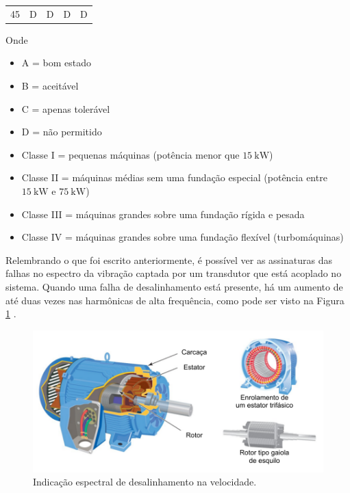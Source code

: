 \begin{table}[H]
\begin{minipage}{.9\textwidth}
\begin{tabular*}{\textwidth}{|c|c|c|c|c|}
            \multicolumn{1}{|c|}{45}              & \multicolumn{1}{c|}{\multirow{-5}{*}{\cellcolor[HTML]{FE0000}D}} & \multicolumn{1}{c|}{\multirow{-4}{*}{\cellcolor[HTML]{FE0000}D}} & \multicolumn{1}{c|}{\multirow{-3}{*}{\cellcolor[HTML]{FE0000}D}} & \multicolumn{1}{c|}{\multirow{-2}{*}{\cellcolor[HTML]{FE0000}D}} \\ \cline{1-1} \cline{5-5}
        \end{tabular*}
    \end{minipage}
  \end{table}

Onde

\begin{itemize}
    \item A = bom estado
    \item B = aceitável
    \item C = apenas tolerável
    \item D = não permitido
    \item Classe I = pequenas máquinas (potência menor que $\SI{15}{\kilo\watt}$)
    \item Classe II = máquinas médias sem uma fundação especial (potência entre $\SI{15}{\kilo\watt}$ e $\SI{75}{\kilo\watt}$)
    \item Classe III = máquinas grandes sobre uma fundação rígida e pesada
    \item Classe IV = máquinas grandes sobre uma fundação flexível (turbomáquinas) 
\end{itemize}

Relembrando o que foi escrito anteriormente, é possível ver as assinaturas das falhas no espectro da vibração captada por um transdutor
que está acoplado no sistema. Quando uma falha de desalinhamento está presente, há um aumento de até duas vezes nas harmônicas de alta 
frequência, como pode ser visto na Figura \ref{fig:misa_analog_p2} \cite{Sopcik2019}.

\begin{figure}[H]
    \caption{Indicação espectral de desalinhamento na velocidade.}
    \begin{center}
        \includegraphics[scale=0.7, page=6]{referencial/img/imagens_referencial.pdf}
    \end{center}
    \label{fig:misa_analog_p2}
\end{figure}

